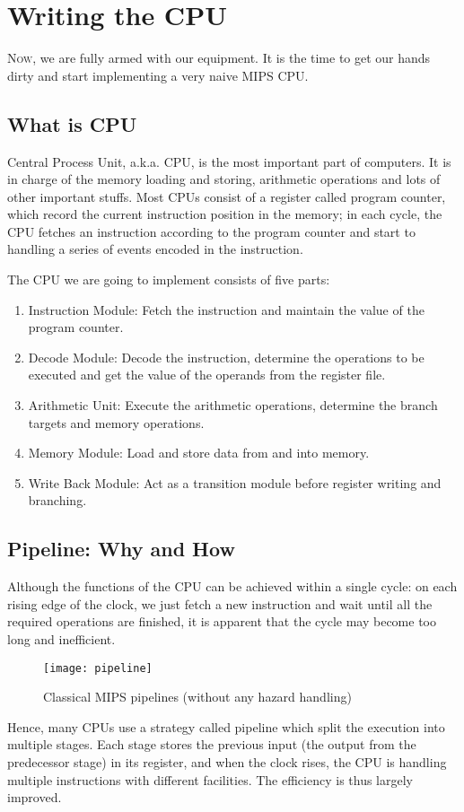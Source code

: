 \chapter{Writing the CPU}
\lettrine{N}{ow}, we are fully armed with our equipment. It is the time to get our hands dirty and start implementing a very naive MIPS CPU.
\section{What is CPU}
Central Process Unit, a.k.a. CPU, is the most important part of computers. It is in charge of the memory loading and storing, arithmetic operations and lots of other important stuffs. Most CPUs consist of a register called program counter, which record the current instruction position in the memory; in each cycle, the CPU fetches an instruction according to the program counter and start to handling a series of events encoded in the instruction.

The CPU we are going to implement consists of five parts:
\begin{enumerate}
	\item Instruction Module: Fetch the instruction and maintain the value of the program counter.
	\item Decode Module: Decode the instruction, determine the operations to be executed and get the value of the operands from the register file.
	\item Arithmetic Unit: Execute the arithmetic operations, determine the branch targets and memory operations.
	\item Memory Module: Load and store data from and into memory.
	\item Write Back Module: Act as a transition module before register writing and branching. 
\end{enumerate}
\section{Pipeline: Why and How}
Although the functions of the CPU can be achieved within a single cycle: on each rising edge of the clock, we just fetch a new instruction and wait until all the required operations are finished, it is apparent that the cycle may become too long and inefficient. 
\begin{figure}[H]
	\centering
	\texttt{[image: pipeline]}
	\caption{Classical MIPS pipelines (without any hazard handling)}
\end{figure}
Hence, many CPUs use a strategy called pipeline which split the execution into multiple stages. Each stage stores the previous input (the output from the predecessor stage) in its register, and when the clock rises, the CPU is handling multiple instructions with different facilities. The efficiency is thus largely improved.

